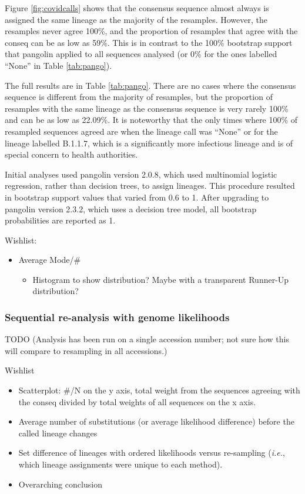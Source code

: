 \documentclass[
]{article}
\providecommand{\tightlist}{%
  \setlength{\itemsep}{0pt}\setlength{\parskip}{0pt}}
\newcommand{\ie}{\textit{i.e.},\xspace}
\begin{document}
Figure \ref{fig:covidcalls} shows that the consensus sequence almost
always is assigned the same lineage as the majority of the resamples.
However, the resamples never agree 100\%, and the proportion of
resamples that agree with the conseq can be as low as 59\%. This is in
contrast to the 100\% bootstrap support that pangolin applied to all
sequences analysed (or 0\% for the ones labelled ``None'' in Table
\ref{tab:pango}).

The full results are in Table \ref{tab:pango}. There are no cases where
the consensus sequence is different from the majority of resamples, but
the proportion of resamples with the same lineage as the consensus
sequence is very rarely 100\% and can be as low as 22.09\%. It is
noteworthy that the only times where 100\% of resampled sequences agreed
are when the lineage call was ``None'' or for the lineage labelled
B.1.1.7, which is a significantly more infectious lineage and is of
special concern to health authorities.

Initial analyses used pangolin version 2.0.8, which used multinomial
logistic regression, rather than decision trees, to assign lineages.
This procedure resulted in bootstrap support values that varied from 0.6
to 1. After upgrading to pangolin version 2.3.2, which uses a decision
tree model, all bootstrap probabilities are reported as 1.

Wishlist:

\begin{itemize}
\tightlist
\item
  Average Mode/\#

  \begin{itemize}
  \tightlist
  \item
    Histogram to show distribution? Maybe with a transparent Runner-Up
    distribution?
  \end{itemize}
\end{itemize}

\hypertarget{sequential-re-analysis-with-genome-likelihoods}{%
\subsubsection{Sequential re-analysis with genome
likelihoods}\label{sequential-re-analysis-with-genome-likelihoods}}

TODO (Analysis has been run on a single accession number; not sure how
this will compare to resampling in all accessions.)

Wishlist

\begin{itemize}
\tightlist
\item
  Scatterplot: \#/N on the y axis, total weight from the sequences
  agreeing with the conseq divided by total weights of all sequences on
  the x axis.
\item
  Average number of substitutions (or average likelihood difference)
  before the called lineage changes
\item
  Set difference of lineages with ordered likelihoods versus re-sampling
  (\ie which lineage assignments were unique to each method).
\item
  Overarching conclusion
\end{itemize}
\end{document}
